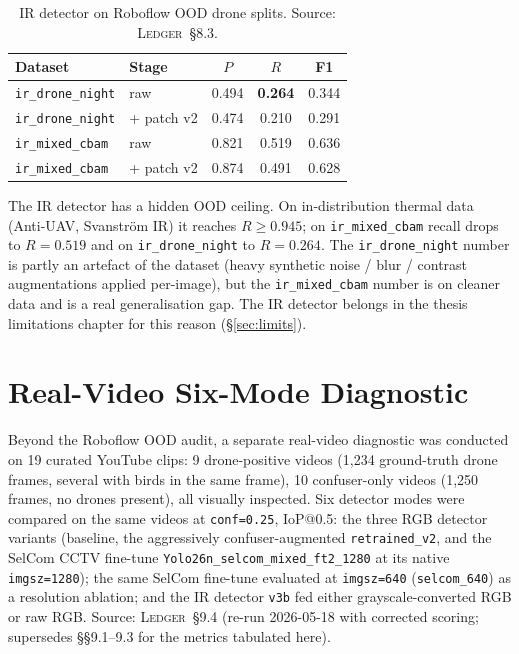 \documentclass[12pt,a4paper,oneside,openright]{book}
\begin{document}
\begin{table}[htbp]
    \centering
    \caption{IR detector on Roboflow OOD drone splits. Source: \textsc{Ledger}~\S8.3.}
    \label{tab:ood_ir}
    \begin{tabular}{llccc}
        \toprule
        Dataset & Stage & $P$ & $R$ & F1 \\
        \midrule
        \texttt{ir\_drone\_night} & raw & 0.494 & \textbf{0.264} & 0.344 \\
        \texttt{ir\_drone\_night} & + patch v2 & 0.474 & 0.210 & 0.291 \\
        \texttt{ir\_mixed\_cbam}  & raw & 0.821 & 0.519 & 0.636 \\
        \texttt{ir\_mixed\_cbam}  & + patch v2 & 0.874 & 0.491 & 0.628 \\
        \bottomrule
    \end{tabular}
\end{table}

The IR detector has a hidden OOD ceiling. On in-distribution thermal data (Anti-UAV, Svanstr\"om IR) it reaches $R \geq 0.945$; on \texttt{ir\_mixed\_cbam} recall drops to $R=0.519$ and on \texttt{ir\_drone\_night} to $R=0.264$. The \texttt{ir\_drone\_night} number is partly an artefact of the dataset (heavy synthetic noise / blur / contrast augmentations applied per-image), but the \texttt{ir\_mixed\_cbam} number is on cleaner data and is a real generalisation gap. The IR detector belongs in the thesis limitations chapter for this reason (\S\ref{sec:limits}).

\section{Real-Video Six-Mode Diagnostic}
\label{sec:realvideo}

Beyond the Roboflow OOD audit, a separate real-video diagnostic was conducted on 19 curated YouTube clips: 9 drone-positive videos (1{,}234 ground-truth drone frames, several with birds in the same frame), 10 confuser-only videos (1{,}250 frames, no drones present), all visually inspected. Six detector modes were compared on the same videos at \texttt{conf=0.25}, IoP@0.5: the three RGB detector variants (baseline, the aggressively confuser-augmented \texttt{retrained\_v2}, and the SelCom CCTV fine-tune \texttt{Yolo26n\_selcom\_mixed\_ft2\_1280} at its native \texttt{imgsz=1280}); the same SelCom fine-tune evaluated at \texttt{imgsz=640} (\texttt{selcom\_640}) as a resolution ablation; and the IR detector \texttt{v3b} fed either grayscale-converted RGB or raw RGB. Source: \textsc{Ledger}~\S9.4 (re-run 2026-05-18 with corrected scoring; supersedes \S\S9.1--9.3 for the metrics tabulated here).
\end{document}

